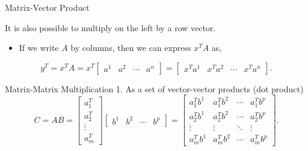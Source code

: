 \documentclass[aspectratio=169,12pt]{beamer}
\begin{document}
\begin{frame}[t]{Matrix-Vector Product}
  \vspace{0.90cm}
  {\large
  It is also possible to multiply on the left by a row vector.
  \begin{itemize}
    \item If we write $A$ by columns, then we can express $x^TA$ as,
  \end{itemize}
  \[
    y^T=x^TA=x^T\begin{bmatrix}a^1&a^2&\cdots&a^n\end{bmatrix}
       =\begin{bmatrix}x^Ta^1&x^Ta^2&\cdots&x^Ta^n\end{bmatrix}.
  \]
  }
\end{frame}

\begin{frame}[t]{Matrix-Matrix Multiplication}
  \vspace{0.55cm}
  {\large
  1. As a set of vector-vector products (dot product)
  \[
    C=AB=
    \begin{bmatrix}a_1^T\\a_2^T\\\vdots\\a_m^T\end{bmatrix}
    \begin{bmatrix}b^1&b^2&\cdots&b^p\end{bmatrix}
    =\begin{bmatrix}
      a_1^Tb^1&a_1^Tb^2&\cdots&a_1^Tb^p\\
      a_2^Tb^1&a_2^Tb^2&\cdots&a_2^Tb^p\\
      \vdots&\vdots&\ddots&\vdots\\
      a_m^Tb^1&a_m^Tb^2&\cdots&a_m^Tb^p
    \end{bmatrix}.
  \]
  }
\end{frame}
\end{document}

